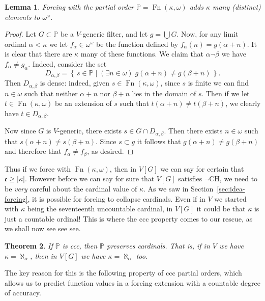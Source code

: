 \documentclass[11pt,oneside]{amsbook}
\newcommand{\set}[1]{\left\{\,#1\,\right\}}
\newcommand{\PP}{\mathbb P}
\DeclareMathOperator{\Fn}{Fn}
\theoremstyle{definition}
\theoremstyle{plain}
\newtheorem{thm}{Theorem}[section]
\newtheorem{lem}[thm]{Lemma}
\theoremstyle{definition}
\theoremstyle{remark}
\begin{document}
\begin{lem}
  Forcing with the partial order $\PP=\Fn(\kappa,\omega)$ adds $\kappa$ many (distinct) elements to $\omega^\omega$.
\end{lem}

\begin{proof}
  Let $G\subset\PP$ be a $V$-generic filter, and let $g=\bigcup G$. Now, for any limit ordinal $\alpha<\kappa$ we let $f_\alpha\in\omega^\omega$ be the function defined by $f_\alpha(n)=g(\alpha+n)$. It is clear that there are $\kappa$ many of these functions. We claim that $\alpha\neg\beta$ we have $f_\alpha\neq g_\alpha$. Indeed, consider the set
  \[D_{\alpha,\beta}=\set{s\in\PP\mid (\exists n\in\omega)\;g(\alpha+n)\neq g(\beta+n)}\text{.}
  \]
  Then $D_{\alpha,\beta}$ is dense: indeed, given $s\in\Fn(\kappa,\omega)$, since $s$ is finite we can find $n\in\omega$ such that neither $\alpha+n$ nor $\beta+n$ lies in the domain of $s$. Then if we let $t\in\Fn(\kappa,\omega)$ be an extension of $s$ such that $t(\alpha+n)\neq t(\beta+n)$, we clearly have $t\in D_{\alpha,\beta}$.

  Now since $G$ is $V$-generic, there exists $s\in G\cap D_{\alpha,\beta}$. Then there exists $n\in\omega$ such that $s(\alpha+n)\neq s(\beta+n)$. Since $s\subset g$ it follows that $g(\alpha+n)\neq g(\beta+n)$ and therefore that $f_\alpha\neq f_\beta$, as desired.
\end{proof}

Thus if we force with $\Fn(\kappa,\omega)$, then in $V[G]$ we can say for certain that $\mathfrak c\geq|\kappa|$. However before we can say for sure that $V[G]$ satisfies $\neg$CH, we need to be \emph{very} careful about the cardinal value of $\kappa$. As we saw in Section~\ref{sec:idea-forcing}, it is possible for forcing to collapse cardinals. Even if in $V$ we started with $\kappa$ being the seventeenth uncountable cardinal, in $V[G]$ it could be that $\kappa$ is just a countable ordinal! This is where the ccc property comes to our rescue, as we shall now see see see.

\begin{thm}
  \label{thm:ccc-preserve}
  If $\PP$ is ccc, then $\PP$ preserves cardinals. That is, if in $V$ we have $\kappa=\aleph_\alpha$, then in $V[G]$ we have $\kappa=\aleph_\alpha$ too.
\end{thm}

The key reason for this is the following property of ccc partial orders, which allows us to predict function values in a forcing extension with a countable degree of accuracy.
\end{document}
